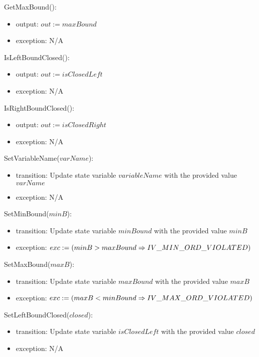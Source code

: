 \documentclass[12pt, titlepage]{article}
\begin{document}
\noindent GetMaxBound():
\begin{itemize}
	\item output: $out := maxBound$
	\item exception: N/A
\end{itemize}

\noindent IsLeftBoundClosed():
\begin{itemize}
	\item output: $out := isClosedLeft$
	\item exception: N/A
\end{itemize}

\noindent IsRightBoundClosed():
\begin{itemize}
	\item output: $out := isClosedRight$
	\item exception: N/A
\end{itemize}

\noindent SetVariableName($varName$):
\begin{itemize}
	\item transition: Update state variable $variableName$ with the provided 
	value $varName$
	\item exception: N/A
\end{itemize}

\noindent SetMinBound($minB$):
\begin{itemize}
	\item transition: Update state variable $minBound$ with the provided value 
	$minB$
	\item exception: $exc := \\
	(minB > maxBound \Rightarrow IV\_MIN\_ORD\_VIOLATED)$
\end{itemize}

\noindent SetMaxBound($maxB$):
\begin{itemize}
	\item transition: Update state variable $maxBound$ with the provided value 
	$maxB$
	\item exception: $exc := \\
	(maxB < minBound \Rightarrow IV\_MAX\_ORD\_VIOLATED)$
\end{itemize}

\noindent SetLeftBoundClosed($closed$):
\begin{itemize}
	\item transition: Update state variable $isClosedLeft$ with the provided 
	value $closed$
	\item exception: N/A
\end{itemize}
\end{document}
